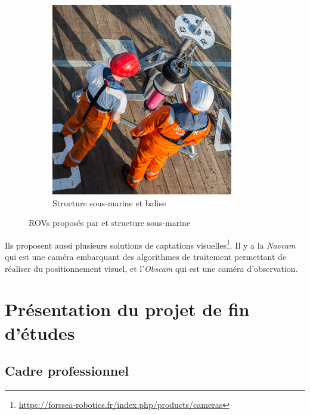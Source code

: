 \begin{figure}[!htb]
\begin{subfigure}[b]{0.3\textwidth}
					\caption{\atoll{}}
				\end{subfigure}
				\hfill
				\begin{subfigure}[b]{0.3\textwidth}
					\centering
					\includegraphics[width=\textwidth]{imgs/frame.png}
					\caption{Structure sous-marine et balise}
				\end{subfigure}
				\caption{\gls{ROV}s proposés par \forssea{} et structure sous-marine}
				\label{fig:ROVs}
			\end{figure}

			Ils proposent aussi plusieurs solutions de captations visuelles\footnote{\url{https://forssea-robotics.fr/index.php/products/cameras}}. Il y a la \textit{Navcam} qui est une caméra embarquant des algorithmes de traitement permettant de réaliser du positionnement visuel, et l'\textit{Obscam} qui est une caméra d'observation.

	\section[Projet de fin d'études]{Présentation du projet de fin d'études}

		\subsection{Cadre professionnel}

